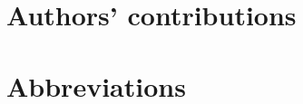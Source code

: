 \documentclass{article}
\begin{document}
\section{Authors' contributions}




\appendix

\section{Abbreviations}
\end{document}
